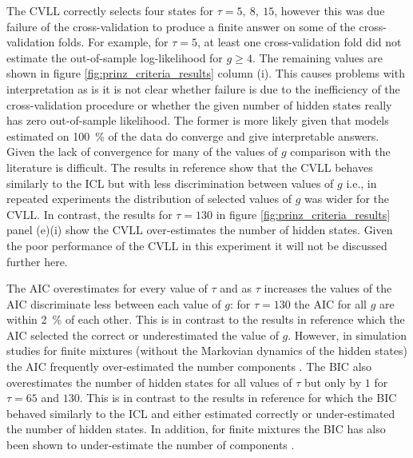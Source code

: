 The CVLL correctly selects four states for $\tau = 5,\ 8,\ 15$, however this was due failure of the cross-validation to produce a finite answer on some of the cross-validation folds. For example, for $\tau=5$, at least one cross-validation fold did not estimate the out-of-sample log-likelihood for $g\ge 4$. The remaining values are shown in figure \ref{fig:prinz_criteria_results} column (i). This causes problems with interpretation as is it is not clear whether failure is due to the  inefficiency of the cross-validation procedure or whether the given number of hidden states really has zero out-of-sample likelihood. The former is more likely given that models estimated on \SI{100}{\percent} of the data do converge and give interpretable answers. Given the lack of convergence for many of the values of $g$ comparison with the literature is difficult. The results in reference \cite{celeuxSelectingHiddenMarkov2008} show that the CVLL behaves similarly to the ICL but with less discrimination between values of $g$ i.e., in repeated experiments the distribution of selected values of $g$ was wider for the CVLL. In contrast, the results for $\tau=130$ in figure \ref{fig:prinz_criteria_results} panel (e)(i) show the CVLL over-estimates the number of hidden states.  Given the poor performance of the CVLL in this experiment it will not be discussed further here. 

The AIC overestimates for every value of $\tau$ and as $\tau$ increases the values of the AIC discriminate less between each value of $g$: for $\tau = 130$ the AIC for all $g$ are within \SI{2}{\percent} of each other. This is in contrast to the results in reference \cite{celeuxSelectingHiddenMarkov2008} which the AIC selected the correct or underestimated the value of $g$. However, in simulation studies for finite mixtures (without the Markovian dynamics of the hidden states) the AIC frequently over-estimated the number components \cite{celeuxEntropyCriterionAssessing1996, soromenho1994comparing}. The BIC also overestimates the number of hidden states for all values of $\tau$ but only by $1$ for $\tau=65$ and $130$. This is in contrast to the results in reference  \cite{celeuxSelectingHiddenMarkov2008} for which the BIC behaved similarly to the ICL and either estimated correctly or under-estimated the number of hidden states.  In addition, for finite mixtures the BIC has also been shown to under-estimate the number of components \cite{biernackiAssessingMixtureModel2000a}.

